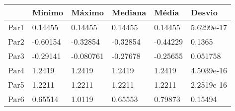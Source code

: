 \begin{tabular}{llllll}
& Mínimo & Máximo & Mediana & Média & Desvio \\ 
\hline 
Par1 & 0.14455 & 0.14455 & 0.14455 & 0.14455 & 5.6299e-17 \\ 
Par2 & -0.60154 & -0.32854 & -0.32854 & -0.44229 & 0.1365 \\ 
Par3 & -0.29141 & -0.080761 & -0.27678 & -0.25655 & 0.051758 \\ 
Par4 & 1.2419 & 1.2419 & 1.2419 & 1.2419 & 4.5039e-16 \\ 
Par5 & 1.2211 & 1.2211 & 1.2211 & 1.2211 & 2.2519e-16 \\ 
Par6 & 0.65514 & 1.0119 & 0.65553 & 0.79873 & 0.15494 \\ 
\hline 
\end{tabular}